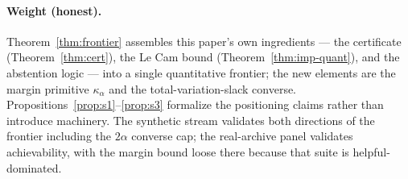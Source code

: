 \paragraph{Weight (honest).} Theorem~\ref{thm:frontier} assembles this paper's own
ingredients --- the certificate (Theorem~\ref{thm:cert}), the Le Cam bound
(Theorem~\ref{thm:imp-quant}), and the abstention logic --- into a single quantitative
frontier; the new elements are the margin primitive $\kappa_\alpha$ and the
total-variation-slack converse. Propositions~\ref{prop:s1}--\ref{prop:s3} formalize the
positioning claims rather than introduce machinery. The synthetic stream validates both
directions of the frontier including the $2\alpha$ converse cap; the real-archive panel
validates achievability, with the margin bound loose there because that suite is
helpful-dominated.
